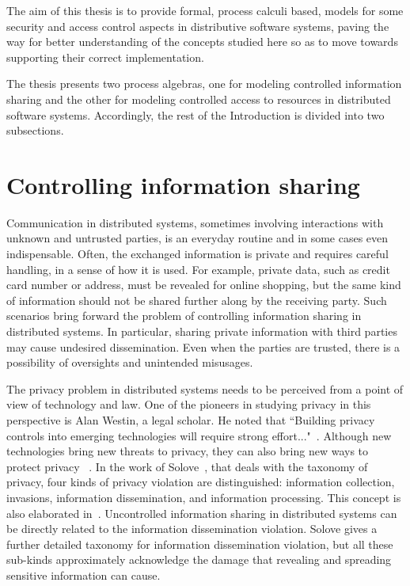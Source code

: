 The aim of this thesis is to provide formal, process calculi based, models for some security 
and access control aspects in distributive software systems, paving the way for better understanding 
of the concepts studied here so as to move towards supporting their correct implementation. 

The thesis presents two process algebras, one for modeling controlled information sharing and the other for modeling controlled access to resources in distributed software systems. Accordingly, the rest of the Introduction is divided into two subsections.




\section{Controlling information sharing}\label{sec:intro_sharing_control}

Communication in distributed systems, sometimes involving interactions with unknown and untrusted parties, is an everyday routine and in some cases even indispensable.
Often, the exchanged information is private and requires careful handling, in a sense of how it is used. 
For example, private data, such as credit card number or address, must be revealed for online shopping, but the same kind of information should not be shared further along by the receiving party. 
Such scenarios bring forward the problem of controlling information sharing in distributed systems. In particular, sharing private information with third parties may cause undesired dissemination.
Even when the parties are trusted, there is a possibility of oversights and unintended misusages.
 


The privacy problem in distributed systems needs to be perceived from a point of view of technology and law.
One of the pioneers in studying privacy in this perspective is Alan Westin, a legal scholar. He noted that
``Building privacy controls into emerging technologies 
will require strong effort..."~\cite{westin2003social}.
Although new technologies bring new threats to privacy, they can also bring new ways to protect privacy 
~\cite{DBLP:conf/fm/TschantzW09}. 
In the work of Solove~\cite{solove2005taxonomy}, that deals with the taxonomy of privacy, four kinds of privacy violation are distinguished: 
information collection, invasions, information 
dissemination, and information processing. This concept is also elaborated in~\cite{DBLP:journals/lmcs/KouzapasP17}. 
Uncontrolled information sharing in distributed systems can be directly related to the information dissemination violation.
Solove gives a further detailed taxonomy for information dissemination violation, but all these sub-kinds approximately acknowledge the damage that revealing and spreading sensitive information can cause. 

